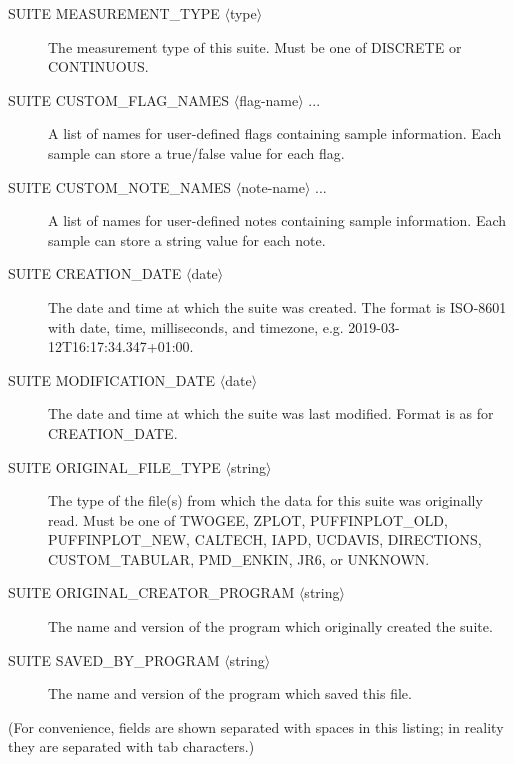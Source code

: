 \documentclass[a4paper,british]{article}
\newcommand{\ppcmd}[1]{\textsf{#1}} %
\begin{document}
\begin{description}

\item[\ppcmd{SUITE MEASUREMENT\_TYPE $\langle$type$\rangle$ }] The measurement type of this suite. Must be one
of \ppcmd{DISCRETE} or \ppcmd{CONTINUOUS}.

\item[\ppcmd{SUITE CUSTOM\_FLAG\_NAMES $\langle$flag-name$\rangle$  ...}] A list of names for user-defined flags
containing sample information. Each sample can store a true/false value for each
flag.

\item[\ppcmd{SUITE CUSTOM\_NOTE\_NAMES $\langle$note-name$\rangle$  ...}] A list of names for user-defined notes
containing sample information. Each sample can store a string value for each
note.

\item[\ppcmd{SUITE CREATION\_DATE $\langle$date$\rangle$ }] The date and time at which the suite was created.
The format is ISO-8601 with date, time, milliseconds, and timezone, e.g.
\ppcmd{2019-03-12T16:17:34.347+01:00}.

\item[\ppcmd{SUITE MODIFICATION\_DATE $\langle$date$\rangle$ }] The date and time at which the suite was last
modified. Format is as for \ppcmd{CREATION\_DATE}.

\item[\ppcmd{SUITE ORIGINAL\_FILE\_TYPE $\langle$string$\rangle$ }] The type of the file(s)
  from which the data for this suite was originally read. Must be one of
  \ppcmd{TWOGEE}, \ppcmd{ZPLOT}, \ppcmd{PUFFINPLOT\_OLD},
  \ppcmd{PUFFINPLOT\_NEW}, \ppcmd{CALTECH}, \ppcmd{IAPD}, \ppcmd{UCDAVIS},
  \ppcmd{DIRECTIONS}, \ppcmd{CUSTOM\_TABULAR}, \ppcmd{PMD\_ENKIN},
  \ppcmd{JR6}, or \ppcmd{UNKNOWN}.

\item[\ppcmd{SUITE ORIGINAL\_CREATOR\_PROGRAM $\langle$string$\rangle$ }] The name and version of the program which
originally created the suite.

\item[\ppcmd{SUITE SAVED\_BY\_PROGRAM $\langle$string$\rangle$ }] The name and version of the program which saved
this file.

\end{description}

\noindent (For convenience, fields are shown separated with spaces in this listing;
in reality they are separated with tab characters.)
\end{document}
